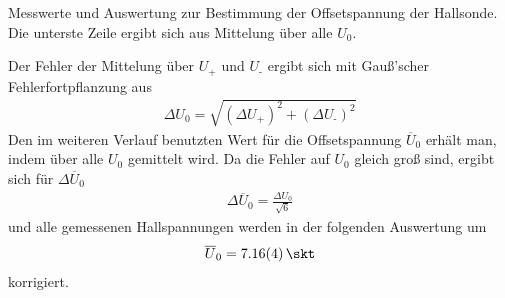 \documentclass[11pt, a4paper]{article}
\numberwithin{equation}{section}
\begin{document}
\begin{table}[h]
	\centering
	
	\caption{Messwerte und Auswertung zur Bestimmung der Offsetspannung der Hallsonde. Die unterste Zeile ergibt sich aus Mittelung über alle $U_0$.}
	\label{tab:offset}
\end{table}
Der Fehler der Mittelung über $U_\text{+}$ und $U_\text{-}$ ergibt sich mit Gauß'scher Fehlerfortpflanzung aus
\begin{align}
	\Delta U_0 = \sqrt{(\Delta U_\text{+})^2 + (\Delta U_\text{-})^2}
\end{align}
Den im weiteren Verlauf benutzten Wert für die Offsetspannung $\overline{U}_0$ erhält man, indem über alle $U_0$ gemittelt wird. Da die Fehler auf $U_0$ gleich groß sind, ergibt sich für $\Delta\overline{U}_0$
\begin{align}
	\Delta\overline{U}_0 = \frac{\Delta U_0}{\sqrt{6}}
\end{align}
und alle gemessenen Hallspannungen werden in der folgenden Auswertung um
\begin{align}
	\overline{U}_0 = \SI{7.16 +- 0.04}{\skt}
	\label{hall_korrektur}
\end{align}
korrigiert.
\end{document}

